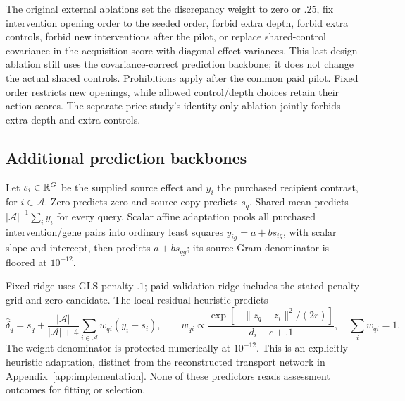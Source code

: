 The original external ablations set the discrepancy weight to zero or $.25$, fix intervention opening order to the seeded order, forbid extra depth, forbid extra controls, forbid new interventions after the pilot, or replace shared-control covariance in the acquisition score with diagonal effect variances. This last design ablation still uses the covariance-correct prediction backbone; it does not change the actual shared controls. Prohibitions apply after the common paid pilot. Fixed order restricts new openings, while allowed control/depth choices retain their action scores. The separate price study's identity-only ablation jointly forbids extra depth and extra controls.

\subsection{Additional prediction backbones}
Let $s_i\in\mathbb R^G$ be the supplied source effect and $y_i$ the purchased recipient contrast, for $i\in\mathcal A$. Zero predicts zero and source copy predicts $s_q$. Shared mean predicts $|\mathcal A|^{-1}\sum_i y_i$ for every query. Scalar affine adaptation pools all purchased intervention/gene pairs into ordinary least squares $y_{ig}=a+bs_{ig}$, with scalar slope and intercept, then predicts $a+bs_{qg}$; its source Gram denominator is floored at $10^{-12}$.

Fixed ridge uses GLS penalty $.1$; paid-validation ridge includes the stated penalty grid and zero candidate. The local residual heuristic predicts
\begin{equation}
 \widehat\delta_q=s_q+\frac{|\mathcal A|}{|\mathcal A|+4}
       \sum_{i\in\mathcal A}w_{qi}(y_i-s_i),\qquad
 w_{qi}\propto\frac{\exp[-\|z_q-z_i\|^2/(2r)]}{d_i+c+.1},
 \quad\sum_i w_{qi}=1.
\end{equation}
The weight denominator is protected numerically at $10^{-12}$. This is an explicitly heuristic adaptation, distinct from the reconstructed transport network in Appendix~\ref{app:implementation}. None of these predictors reads assessment outcomes for fitting or selection.

